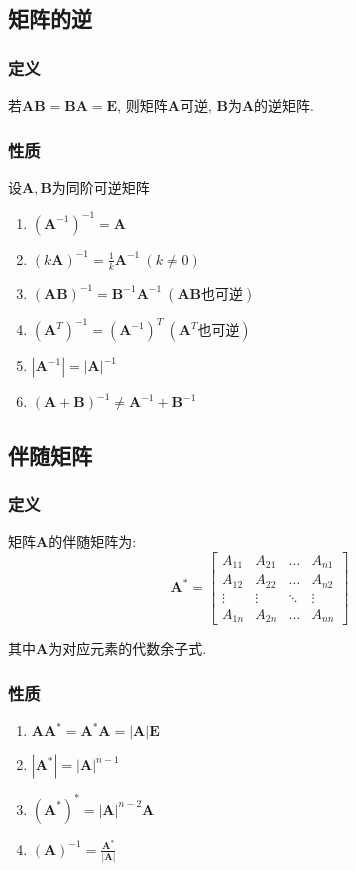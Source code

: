 \subsection{矩阵的逆}
\subsubsection{定义}
若$ \bm{A}\bm{B}=\bm{B}\bm{A}=\bm{E} $, 则矩阵$ \bm{A} $可逆, $ \bm{B} $为$ \bm{A} $的逆矩阵.
\subsubsection{性质}
设$ \bm{A}, \bm{B} $为同阶可逆矩阵
\begin{enumerate}
	\item $ (\bm{A}^{-1})^{-1}=\bm{A} $
	\item $ (k\bm{A})^{-1}=\frac{1}{k}\bm{A}^{-1}\ (k\neq 0) $
	\item $ (\bm{A}\bm{B})^{-1}=\bm{B}^{-1}\bm{A}^{-1}\ (\bm{A}\bm{B}\text{也可逆}) $
	\item $ (\bm{A}^{T})^{-1}=(\bm{A}^{-1})^{T}\ (\bm{A}^{T}\text{也可逆}) $
	\item $ |\bm{A}^{-1}|=|\bm{A}|^{-1} $
	\item $ (\bm{A}+\bm{B})^{-1}\neq \bm{A}^{-1}+\bm{B}^{-1} $
\end{enumerate}
\subsection{伴随矩阵}
\subsubsection{定义}
矩阵$ \bm{A} $的伴随矩阵为:
\begin{equation*}
	\bm{A}^{*}=
	\begin{bmatrix}
	A_{11}	& A_{21} & \dots & A_{n1} \\
	A_{12}	& A_{22} & \dots & A_{n2} \\
	\vdots	& \vdots & \ddots & \vdots \\
	A_{1n}	& A_{2n} & \dots & A_{nn}
	\end{bmatrix}
\end{equation*}\par
其中$ \bm{A} $为对应元素的代数余子式.
\subsubsection{性质}
\begin{enumerate}
	\item $ \bm{A}\bm{A}^{*}=\bm{A}^{*}\bm{A}=|\bm{A}|\bm{E} $
	\item $ |\bm{A}^{*}|=|\bm{A}|^{n-1} $
	\item $ (\bm{A}^{*})^{*}=|\bm{A}|^{n-2}\bm{A} $
	\item $ (\bm{A})^{-1}=\frac{\bm{A}^{*}}{|\bm{A}|} $
\end{enumerate}
